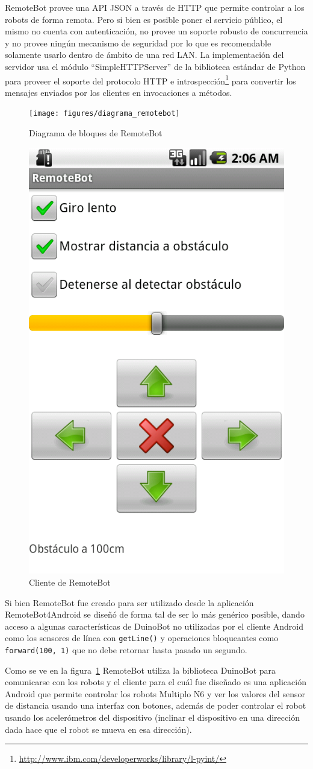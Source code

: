 RemoteBot provee una API JSON a través de HTTP que permite controlar a los
robots de forma remota. Pero si bien es posible poner el servicio público,
el mismo no cuenta con autenticación, no provee un soporte robusto de
concurrencia y no provee ningún mecanismo de seguridad por lo que es
recomendable solamente usarlo dentro de ámbito de una red LAN.
La implementación del servidor
usa el módulo ``SimpleHTTPServer'' de la biblioteca estándar de Python para
proveer el soporte del protocolo HTTP e
introspección\footnote{\url{http://www.ibm.com/developerworks/library/l-pyint/}}
para convertir los
mensajes enviados por los clientes en invocaciones a métodos.

\begin{figure}
    \centering
    \texttt{[image: figures/diagrama\_remotebot]}
    \caption{Diagrama de bloques de RemoteBot}
    \label{fig:diagrama_remotebot}
\end{figure}
\begin{figure}
    \centering
    \includegraphics[width=.20\textwidth]{figures/cliente_remotebot}
    \caption{Cliente de RemoteBot}
    \label{fig:cliente_remotebot}
\end{figure}

Si bien RemoteBot fue creado para ser utilizado desde la
aplicación RemoteBot4Android
se diseñó de forma tal de ser lo más genérico posible, dando acceso
a algunas características de DuinoBot no utilizadas por el cliente
Android como los sensores de línea con \texttt{getLine()} y operaciones
bloqueantes como \texttt{forward(100, 1)} que no debe retornar
hasta pasado un segundo.

Como se ve en la figura~\ref{fig:diagrama_remotebot} RemoteBot utiliza la
biblioteca DuinoBot para comunicarse con los robots y el cliente para el cuál
fue diseñado es una aplicación Android que permite controlar los robots
Multiplo N6
y ver los valores del sensor de distancia usando una interfaz con botones,
además de poder controlar el robot usando los acelerómetros del dispositivo
(inclinar el dispositivo en una dirección dada hace que el robot se mueva
en esa dirección).

